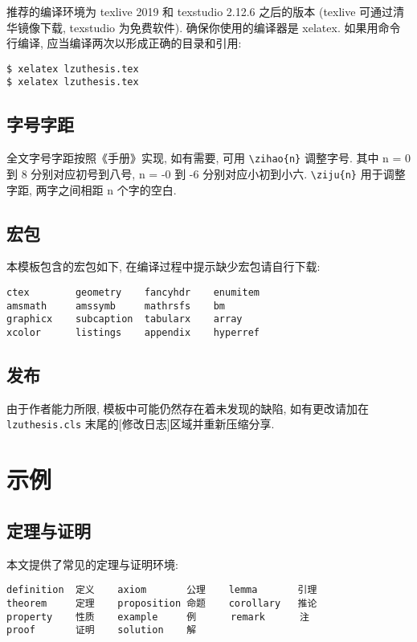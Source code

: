 \documentclass{lzuthesis}
\begin{document}
推荐的编译环境为 texlive 2019 和 texstudio 2.12.6 之后的版本
(texlive 可通过清华镜像下载, texstudio 为免费软件).
确保你使用的编译器是 xelatex. 如果用命令行编译,
应当编译两次以形成正确的目录和引用:

\begin{verbatim}
$ xelatex lzuthesis.tex
$ xelatex lzuthesis.tex
\end{verbatim}

\subsection{字号字距}

全文字号字距按照《手册》实现, 如有需要, 可用 \verb|\zihao{n}| 调整字号. 其中 n = 0 到 8 分别对应初号到八号, n = -0 到 -6 分别对应小初到小六. \verb|\ziju{n}| 用于调整字距, 两字之间相距 n 个字的空白.

\subsection{宏包}

本模板包含的宏包如下, 在编译过程中提示缺少宏包请自行下载:

\begin{verbatim}
ctex        geometry    fancyhdr    enumitem
amsmath     amssymb     mathrsfs    bm
graphicx    subcaption  tabularx    array
xcolor      listings    appendix    hyperref
\end{verbatim}

\subsection{发布}

由于作者能力所限, 模板中可能仍然存在着未发现的缺陷, 如有更改请加在
\texttt{lzuthesis.cls} 末尾的[修改日志]区域并重新压缩分享. 

\section{示例}

\subsection{定理与证明}

本文提供了常见的定理与证明环境:

\begin{verbatim}
definition  定义    axiom       公理    lemma       引理
theorem     定理    proposition 命题    corollary   推论
property    性质    example     例      remark      注
proof       证明    solution    解
\end{verbatim}
\end{document}
